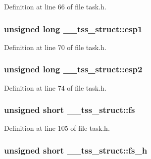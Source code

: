Definition at line 66 of file task.\+h.

\subsubsection[{\texorpdfstring{esp1}{esp1}}]{\setlength{\rightskip}{0pt plus 5cm}unsigned long \+\_\+\+\_\+tss\+\_\+struct\+::esp1}\hypertarget{struct____tss__struct_a0c8844d2b2cd289b6d8b91cb37089592}{}\label{struct____tss__struct_a0c8844d2b2cd289b6d8b91cb37089592}


Definition at line 70 of file task.\+h.

\subsubsection[{\texorpdfstring{esp2}{esp2}}]{\setlength{\rightskip}{0pt plus 5cm}unsigned long \+\_\+\+\_\+tss\+\_\+struct\+::esp2}\hypertarget{struct____tss__struct_aae8e9f58e67ba8b83b7d9876885ff68b}{}\label{struct____tss__struct_aae8e9f58e67ba8b83b7d9876885ff68b}


Definition at line 74 of file task.\+h.

\subsubsection[{\texorpdfstring{fs}{fs}}]{\setlength{\rightskip}{0pt plus 5cm}unsigned short \+\_\+\+\_\+tss\+\_\+struct\+::fs}\hypertarget{struct____tss__struct_a4f47bf398ce57037b89c3b9f42e0ce18}{}\label{struct____tss__struct_a4f47bf398ce57037b89c3b9f42e0ce18}


Definition at line 105 of file task.\+h.

\subsubsection[{\texorpdfstring{fs\+\_\+h}{fs_h}}]{\setlength{\rightskip}{0pt plus 5cm}unsigned short \+\_\+\+\_\+tss\+\_\+struct\+::fs\+\_\+h}\hypertarget{struct____tss__struct_a065694d5def8420fa4411053c460cb04}{}\label{struct____tss__struct_a065694d5def8420fa4411053c460cb04}


